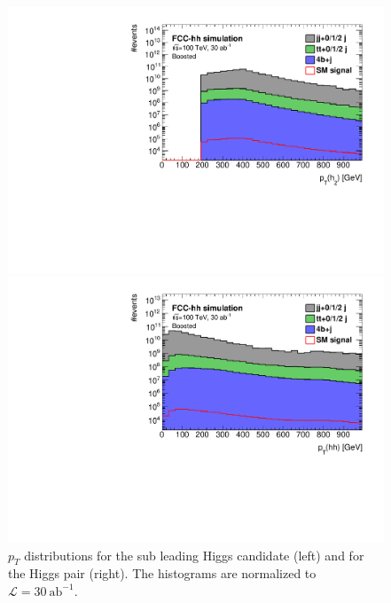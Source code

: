 \begin{figure}
	\centering
	\begin{minipage}{.5\textwidth}
		\centering
		\includegraphics[trim={.65cm 0 0 0},clip,width=\linewidth]{./Figures/hist_h2_pt_stack.pdf}
	\end{minipage}%
	\begin{minipage}{.5\textwidth}
		\centering
		\includegraphics[trim={0 0 .65cm 0},clip,width=\linewidth]{./Figures/hist_hh_pt_stack.pdf}
	\end{minipage}
	\label{fig:pt_stack}
	\caption{$p_T$ distributions for the sub leading Higgs candidate (left) and for the Higgs pair (right). The histograms are normalized to $\mathcal{L}=30~\text{ab}^{-1}$.}
\end{figure} 

